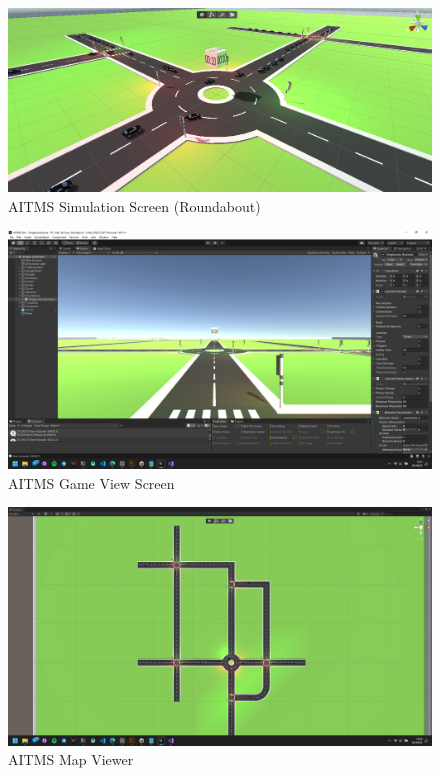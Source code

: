 \documentclass[openany,12pt]{report}
\begin{document}
		\begin{figure}[H]
			\centering
			\includegraphics[width=6in]{./Diagrams/PNG/livescene}
			\caption{AITMS Simulation Screen (Roundabout)}
		\end{figure}
		
		\begin{figure}[H]
			\centering
			\includegraphics[width=6in]{./Diagrams/PNG/scene2}
			\caption{AITMS Game View Screen}
		\end{figure}
		
		\begin{figure}[H]
			\centering
			\includegraphics[width=6in]{./Diagrams/PNG/fulllive}
			\caption{AITMS Map Viewer}
		\end{figure}
		
\end{document}

